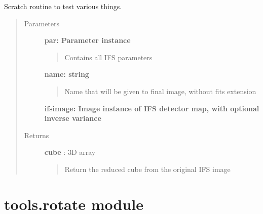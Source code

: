 \documentclass[letterpaper,10pt,english]{sphinxmanual}
\begin{document}
\begin{fulllineitems}
\label{tools:tools.reduction.testReduction}
Scratch routine to test various things.
\begin{quote}\begin{description}
\item[{Parameters}] \leavevmode
\textbf{par:    Parameter instance}
\begin{quote}

Contains all IFS parameters
\end{quote}

\textbf{name: string}
\begin{quote}

Name that will be given to final image, without fits extension
\end{quote}

\textbf{ifsimage: Image instance of IFS detector map, with optional inverse variance}

\item[{Returns}] \leavevmode
\textbf{cube} :  3D array
\begin{quote}

Return the reduced cube from the original IFS image
\end{quote}

\end{description}\end{quote}

\end{fulllineitems}



\section{tools.rotate module}
\label{tools:tools-rotate-module}\label{tools:module-tools.rotate}
\end{document}
